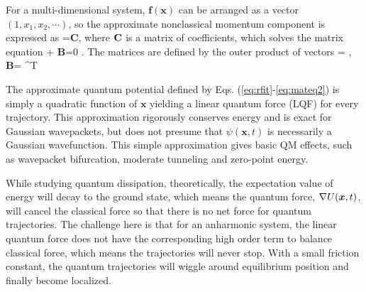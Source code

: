 \documentclass[11pt]{revtex4}
\begin{document}
For a multi-dimensional system, $\bm f(\bm x)$ can be arranged as a vector  $(1,x_1,x_2,\cdots)$, so the approximate nonclassical momentum component is  expressed as 
\be {}={\bf C}, \ee
where $\bf C$ is a matrix of coefficients, which solves the matrix equation  
 + {\bf B}=0  \label{eq:mateq}. \ee 
The matrices are defined by the  outer product of vectors  
=\bra {} \otimes {}\ket,~ {\bf B}= \bra {\nabla} \otimes {} \ket^T \label{eq:mateq2}\ee

The approximate quantum potential defined by Eqs. (\ref{eq:rfit}-\ref{eq:mateq2}) is simply a quadratic 
function of $\bm{x}$ yielding a linear quantum force (LQF) for every trajectory.  This approximation rigorously 
conserves energy and is exact for Gaussian wavepackets, but does not presume that $\psi(\bm{x},t)$ is necessarily a Gaussian wavefunction.  
This simple approximation gives basic QM effects, such as wavepacket bifurcation, moderate tunneling and
zero-point energy. \cite{garashchuk_rcc}

While studying quantum dissipation, theoretically, the expectation value of energy will decay to the ground state,  which means the quantum force, $\nabla U(\bm x,t)$, will cancel the classical force so that there is no net force for quantum trajectories. The challenge here is that for an anharmonic system, 
the linear quantum force does not have the corresponding high order term to balance classical force, which means the trajectories will never stop. With a small friction constant, the quantum trajectories will wiggle around equilibrium position and finally become localized.
\end{document}

